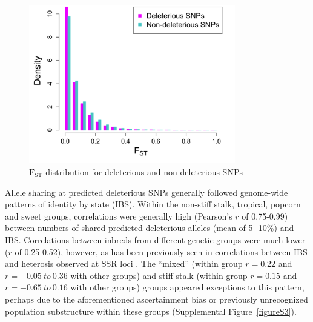 \documentclass[12pt]{article}
\begin{document}
\begin{figure}[!t]
  \begin{center}
   \includegraphics[width=90mm]{Fst.png}
    \caption{$\mathrm{F}_{\mathrm{ST}}$ distribution for deleterious and non-deleterious SNPs}
   \label{fst_dist}
  \end{center}
\end{figure}


Allele sharing at predicted deleterious SNPs generally followed genome-wide patterns of identity by state (IBS). Within the non-stiff stalk, tropical, popcorn and sweet groups, correlations were generally high (Pearson's $r$ of 0.75-0.99) between numbers of shared predicted deleterious alleles (mean of 5 -10\%) and IBS. Correlations between inbreds from different genetic groups were much lower ($r$ of 0.25-0.52), however, as has been previously seen in correlations  between IBS and heterosis observed at SSR loci \citep{Flint-Garcia2009}. The  ``mixed'' (within group $r=0.22$ and $r=-0.05\ to\ 0.36$ with other groups) and stiff stalk (within-group $r=0.15$ and $r=-0.65\ to\ 0.16$ with other groups) groups appeared exceptions to this pattern, perhaps due to the aforementioned ascertainment bias or previously unrecognized population substructure within these groups (Supplemental Figure~\ref{figureS3}). 
\end{document}
